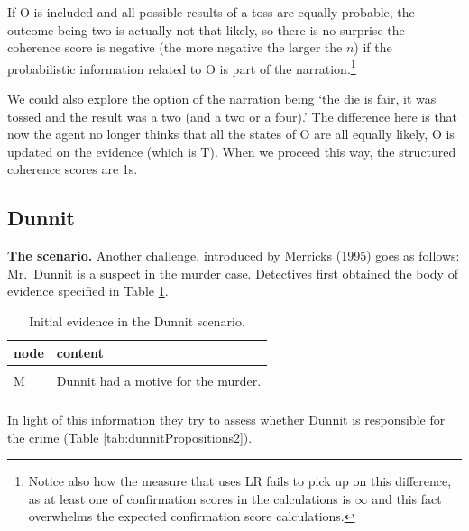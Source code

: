\documentclass[
  10pt,
]{scrartcl}
\newcommand{\s}[1]{\textsf{#1}}
\begin{document}
If \s{O} is included and all possible results of a toss are equally probable, the outcome being two is actually not that likely, so there is no surprise the coherence score is negative (the more negative the larger the \(n\)) if the probabilistic information related to \s{O} is part of the narration.\footnote{Notice also how the measure that uses LR fails to pick up on this difference, as at least one of confirmation scores in the calculations is \(\infty\) and this fact overwhelms the expected confirmation score calculations.}

We could also explore the option of the narration being `the die is fair, it was tossed and the result was a two (and a two or a four).' The difference here is that now the agent no longer thinks that all the states of \s{O} are all equally likely, \s{O} is updated on the evidence (which is \s{T}). When we proceed this way, the structured coherence scores are 1s.

\hypertarget{dunnit}{%
\subsection{Dunnit}\label{dunnit}}

\textbf{The scenario.} Another challenge, introduced by Merricks (1995) goes as follows: Mr.~Dunnit is a suspect in the murder case. Detectives first obtained the body of evidence specified in Table \ref{tab:dunnitPropositions1}.

\begin{table}[H]

\caption{\label{tab:dunnitPropositions1}Initial evidence in the Dunnit scenario.}
\centering
\begin{tabular}[t]{l>{\raggedright\arraybackslash}p{25em}}
\toprule
node & content\\
\midrule
\cellcolor{gray!6}{I} & \cellcolor{gray!6}{Witnesses claim to have seen Dunnit do it (incriminating testimony).}\\
M & Dunnit had a motive for the murder.\\
\cellcolor{gray!6}{W} & \cellcolor{gray!6}{A credible witness claims to have seen Dunnit two hundred miles from the scene of the crime at the time of the murder.}\\
\bottomrule
\end{tabular}
\end{table}

\noindent In light of this information they try to assess whether Dunnit is responsible for the crime (Table \ref{tab:dunnitPropositions2}).
\end{document}
